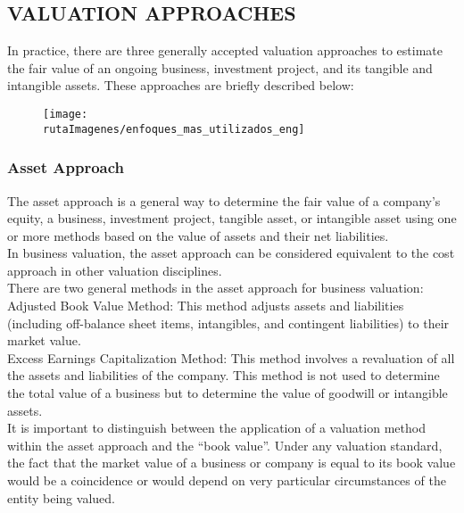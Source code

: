 
\subsection{VALUATION APPROACHES}

In practice, there are three generally accepted valuation approaches to estimate the fair value of an ongoing business, investment project, and its tangible and intangible assets. These approaches are briefly described below:

\begin{figure}[H]
\centering
\texttt{[image: \\rutaImagenes/enfoques\_mas\_utilizados\_eng]}
\end{figure}

\subsubsection{Asset Approach}

The asset approach is a general way to determine the fair value of a company's equity, a business, investment project, tangible asset, or intangible asset using one or more methods based on the value of assets and their net liabilities.\\[10pt]

In business valuation, the asset approach can be considered equivalent to the cost approach in other valuation disciplines. \\[10pt]

There are two general methods in the asset approach for business valuation:\\[10pt]

\textcolor{secundario}{Adjusted Book Value Method:} This method adjusts assets and liabilities (including off-balance sheet items, intangibles, and contingent liabilities) to their market value.\\[10pt]

\textcolor{secundario}{Excess Earnings Capitalization Method:} This method involves a revaluation of all the assets and liabilities of the company. This method is not used to determine the total value of a business but to determine the value of goodwill or intangible assets.\\[10pt]

It is important to distinguish between the application of a valuation method within the asset approach and the ``book value''. Under any valuation standard, the fact that the market value of a business or company is equal to its book value would be a coincidence or would depend on very particular circumstances of the entity being valued.\\[10pt]

